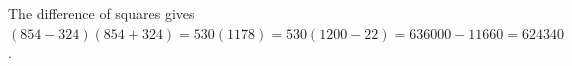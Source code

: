 The difference of squares gives $(854-324)(854+324)=530(1178)=530(1200-22)=636000-11660=\boxed{624340}$.
